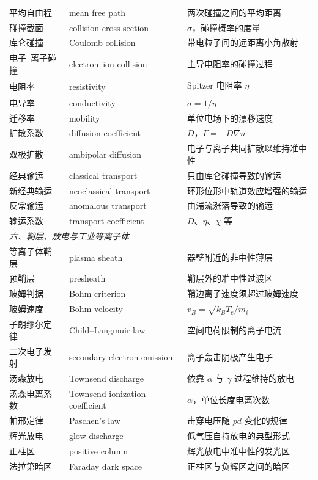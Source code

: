\documentclass[12pt,a4paper,openany,oneside]{book}
\newcommand{\grad}{\nabla}
\begin{document}
{\begin{longtable}{@{}p{4.2cm}p{5.6cm}p{4.8cm}@{}}
平均自由程 & mean free path & 两次碰撞之间的平均距离 \\
碰撞截面 & collision cross section & $\sigma$，碰撞概率的度量 \\
库仑碰撞 & Coulomb collision & 带电粒子间的远距离小角散射 \\
电子--离子碰撞 & electron--ion collision & 主导电阻率的碰撞过程 \\
电阻率 & resistivity & Spitzer 电阻率 $\eta_\parallel$ \\
电导率 & conductivity & $\sigma = 1/\eta$ \\
迁移率 & mobility & 单位电场下的漂移速度 \\
扩散系数 & diffusion coefficient & $D$，$\Gamma = -D\grad n$ \\
双极扩散 & ambipolar diffusion & 电子与离子共同扩散以维持准中性 \\
经典输运 & classical transport & 只由库仑碰撞导致的输运 \\
新经典输运 & neoclassical transport & 环形位形中轨道效应增强的输运 \\
反常输运 & anomalous transport & 由湍流涨落导致的输运 \\
输运系数 & transport coefficient & $D$、$\eta$、$\chi$ 等 \\
\multicolumn{3}{l}{\textit{六、鞘层、放电与工业等离子体}} \\
\midrule
等离子体鞘层 & plasma sheath & 器壁附近的非中性薄层 \\
预鞘层 & presheath & 鞘层外的准中性过渡区 \\
玻姆判据 & Bohm criterion & 鞘边离子速度须超过玻姆速度 \\
玻姆速度 & Bohm velocity & $v_B = \sqrt{k_{B}T_e/m_i}$ \\
子朗缪尔定律 & Child--Langmuir law & 空间电荷限制的离子电流 \\
二次电子发射 & secondary electron emission & 离子轰击阴极产生电子 \\
汤森放电 & Townsend discharge & 依靠 $\alpha$ 与 $\gamma$ 过程维持的放电 \\
汤森电离系数 & Townsend ionization coefficient & $\alpha$，单位长度电离次数 \\
帕邢定律 & Paschen's law & 击穿电压随 $pd$ 变化的规律 \\
辉光放电 & glow discharge & 低气压自持放电的典型形式 \\
正柱区 & positive column & 辉光放电中准中性的发光区 \\
法拉第暗区 & Faraday dark space & 正柱区与负辉区之间的暗区 \\

\end{longtable}}
\end{document}

